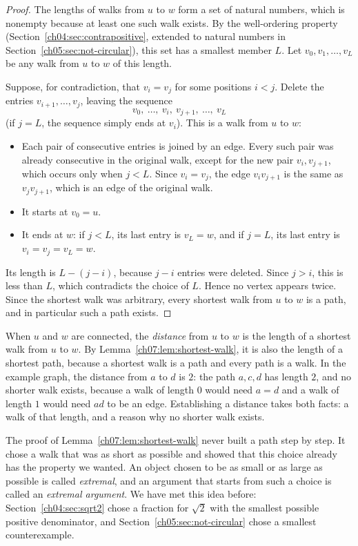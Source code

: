 \begin{proof}
The lengths of walks from $u$ to $w$ form a set of natural numbers, which is nonempty because at least one such walk exists. By the well-ordering property (Section~\ref{ch04:sec:contrapositive}, extended to natural numbers in Section~\ref{ch05:sec:not-circular}), this set has a smallest member $L$. Let $v_0,v_1,\ldots,v_L$ be any walk from $u$ to $w$ of this length.

Suppose, for contradiction, that $v_i=v_j$ for some positions $i<j$. Delete the entries $v_{i+1},\ldots,v_j$, leaving the sequence
\[
v_0,\ \ldots,\ v_i,\ v_{j+1},\ \ldots,\ v_L
\]
(if $j=L$, the sequence simply ends at $v_i$). This is a walk from $u$ to $w$:
\begin{itemize}
\item Each pair of consecutive entries is joined by an edge. Every such pair was already consecutive in the original walk, except for the new pair $v_i,v_{j+1}$, which occurs only when $j<L$. Since $v_i=v_j$, the edge $v_iv_{j+1}$ is the same as $v_jv_{j+1}$, which is an edge of the original walk.
\item It starts at $v_0=u$.
\item It ends at $w$: if $j<L$, its last entry is $v_L=w$, and if $j=L$, its last entry is $v_i=v_j=v_L=w$.
\end{itemize}
Its length is $L-(j-i)$, because $j-i$ entries were deleted. Since $j>i$, this is less than $L$, which contradicts the choice of $L$. Hence no vertex appears twice. Since the shortest walk was arbitrary, every shortest walk from $u$ to $w$ is a path, and in particular such a path exists.
\end{proof}

When $u$ and $w$ are connected, the \emph{distance} from $u$ to $w$ is the length of a shortest walk from $u$ to $w$. By Lemma~\ref{ch07:lem:shortest-walk}, it is also the length of a shortest path, because a shortest walk is a path and every path is a walk. In the example graph, the distance from $a$ to $d$ is $2$: the path $a,c,d$ has length $2$, and no shorter walk exists, because a walk of length $0$ would need $a=d$ and a walk of length $1$ would need $ad$ to be an edge. Establishing a distance takes both facts: a walk of that length, and a reason why no shorter walk exists.

The proof of Lemma~\ref{ch07:lem:shortest-walk} never built a path step by step. It chose a walk that was as short as possible and showed that this choice already has the property we wanted. An object chosen to be as small or as large as possible is called \emph{extremal}, and an argument that starts from such a choice is called an \emph{extremal argument}. We have met this idea before: Section~\ref{ch04:sec:sqrt2} chose a fraction for $\sqrt2$ with the smallest possible positive denominator, and Section~\ref{ch05:sec:not-circular} chose a smallest counterexample.
